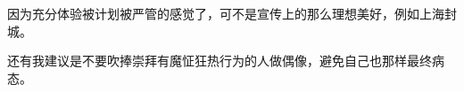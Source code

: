 \begin{zhihuanswer}
因为充分体验被计划被严管的感觉了，可不是宣传上的那么理想美好，例如上海封城。

还有我建议是不要吹捧崇拜有魔怔狂热行为的人做偶像，避免自己也那样最终病态。
\end{zhihuanswer}

